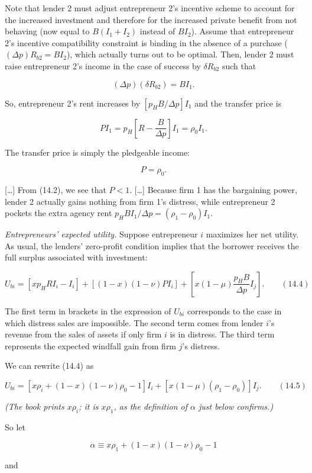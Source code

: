 \documentclass[11pt,a4paper]{article}
\begin{document}
Note that lender 2 must adjust entrepreneur 2's incentive scheme to account for the increased
investment and therefore for the increased private benefit from not behaving (now equal to
\(B(I_1 + I_2)\) instead of \(BI_2\)). Assume that entrepreneur 2's incentive compatibility
constraint is binding in the absence of a purchase (\((\Delta p)R_{b2} = BI_2\)), which actually
turns out to be optimal. Then, lender 2 must raise entrepreneur 2's income in the case of success by
\(\delta R_{b2}\) such that

\[(\Delta p)(\delta R_{b2}) = BI_1.\]

So, entrepreneur 2's rent increases by \([p_H B/\Delta p]I_1\) and the transfer price is

\[PI_1 = p_H\left[R - \frac{B}{\Delta p}\right]I_1 = \rho_0 I_1.\]

The transfer price is simply the pledgeable income:

\[P = \rho_0.\]

{[}\ldots{]} From (14.2), we see that \(P < 1\). {[}\ldots{]} Because firm 1 has the bargaining
power, lender 2 actually gains nothing from firm 1's distress, while entrepreneur 2 pockets the
extra agency rent \(p_H BI_1/\Delta p = (\rho_1 - \rho_0)I_1\).

\emph{Entrepreneurs' expected utility.} Suppose entrepreneur \(i\) maximizes her net utility. As
usual, the lenders' zero-profit condition implies that the borrower receives the full surplus
associated with investment:

\[U_{bi} = [xp_H RI_i - I_i] + [(1 - x)(1 - \nu)PI_i] + \left[x(1 - \mu)\frac{p_H B}{\Delta p} I_j\right]. \qquad (14.4)\]

The first term in brackets in the expression of \(U_{bi}\) corresponds to the case in which distress
sales are impossible. The second term comes from lender \(i\)'s revenue from the sales of assets if
only firm \(i\) is in distress. The third term represents the expected windfall gain from firm
\(j\)'s distress.

We can rewrite (14.4) as

\[U_{bi} = [x\rho_i + (1 - x)(1 - \nu)\rho_0 - 1]I_i + [x(1 - \mu)(\rho_1 - \rho_0)]I_j. \qquad (14.5)\]

\emph{(The book prints \(x\rho_i\); it is \(x\rho_1\), as the definition of \(\alpha\) just below
confirms.)}

So let

\[\alpha \equiv x\rho_1 + (1 - x)(1 - \nu)\rho_0 - 1\]

and
\end{document}
